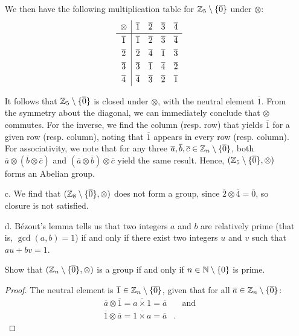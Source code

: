 \documentclass[11pt]{article}
\newcommand{\cls}[1]{\overline{#1}}
\begin{document}
\begin{enumerate}
          We then have the following multiplication table for $\Z_5 \setminus \{\cls{0}\}$ under $\otimes$:
          \[
              \begingroup
              \renewcommand{\arraystretch}{1.3}
              \begin{array}{c|ccccc}
                  \otimes & \cls{1} & \cls{2} & \cls{3} & \cls{4} \\
                  \hline
                  \cls{1} & \cls{1} & \cls{2} & \cls{3} & \cls{4} \\
                  \cls{2} & \cls{2} & \cls{4} & \cls{1} & \cls{3} \\
                  \cls{3} & \cls{3} & \cls{1} & \cls{4} & \cls{2} \\
                  \cls{4} & \cls{4} & \cls{3} & \cls{2} & \cls{1} \\
              \end{array}
              \endgroup
          \]

          It follows that $\Z_5 \setminus \{\cls{0}\}$ is closed under $\otimes$, with the neutral element $\cls{1}$.
          From the symmetry about the diagonal, we can immediately conclude that $\otimes$ commutes.  For the inverse,
          we find the column (resp. row) that yields $\cls{1}$ for a given row (resp. column), noting that $\cls{1}$
          appears in every row (resp. column).  For associativity, we note that for any three $\cls{a}, \cls{b}, \cls{c}
              \in \Z_n \setminus \{\cls{0}\}$, both $\cls{a} \otimes (\cls{b} \otimes \cls{c})$ and $(\cls{a} \otimes
              \cls{b}) \otimes \cls{c}$ yield the same result.  Hence, $(\Z_5 \setminus \{\cls{0}\}, \otimes)$ forms an
          Abelian group.

    \item[c.] We find that $(\Z_8 \setminus \{\cls{0}\}, \otimes)$ does not form a group, since $ \cls{2} \otimes
              \cls{4} = \cls{0} $, so closure is not satisfied.

    \item[d.] Bézout's lemma tells us that two integers $a$ and $b$ are relatively prime (that is, $\gcd(a, b) = 1$) if
          and only if there exist two integers $u$ and $v$ such that $au + bv = 1$.

          Show that $(\Z_n \setminus \{\cls{0}\}, \otimes)$ is a group if and only if $n \in \mathbb{N} \setminus \{0\}$ is
          prime.

          \begin{proof}[Proof]
              The neutral element is $\cls{1} \in \Z_n \setminus \{\cls{0}\}$, given that for all $\cls{a} \in \Z_n
                  \setminus \{\cls{0}\}$:
              \[
                  \begin{aligned}
                      \cls{a} \otimes \cls{1} = \cls{a \times 1} = \cls{a} & \quad \textrm{and} \\
                      \cls{1} \otimes \cls{a} = \cls{1 \times a} = \cls{a} & .
                  \end{aligned}
              \]


\end{proof}
\end{enumerate}
\end{document}
